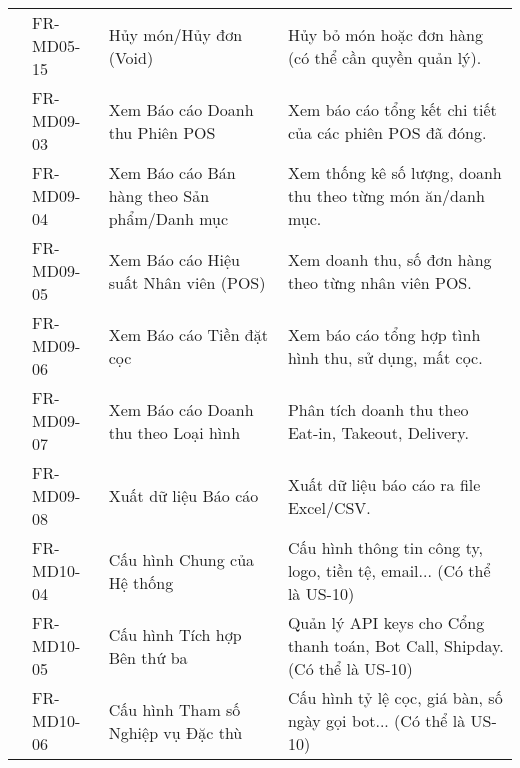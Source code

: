 \begin{longtable}{|m{2.5cm}|m{2.5cm}|m{5cm}|m{5cm}|}
	                                                        & FR-MD05-15            & Hủy món/Hủy đơn (Void)                                 & Hủy bỏ món hoặc đơn hàng (có thể cần quyền quản lý).                                        \\ \cline{2-4}
	                                                        & FR-MD09-03            & Xem Báo cáo Doanh thu Phiên POS                        & Xem báo cáo tổng kết chi tiết của các phiên POS đã đóng.                                    \\
	                                                        & FR-MD09-04            & Xem Báo cáo Bán hàng theo Sản phẩm/Danh mục            & Xem thống kê số lượng, doanh thu theo từng món ăn/danh mục.                                 \\
	                                                        & FR-MD09-05            & Xem Báo cáo Hiệu suất Nhân viên (POS)                  & Xem doanh thu, số đơn hàng theo từng nhân viên POS.                                         \\
	                                                        & FR-MD09-06            & Xem Báo cáo Tiền đặt cọc                               & Xem báo cáo tổng hợp tình hình thu, sử dụng, mất cọc.                                       \\
	                                                        & FR-MD09-07            & Xem Báo cáo Doanh thu theo Loại hình                   & Phân tích doanh thu theo Eat-in, Takeout, Delivery.                                         \\
	                                                        & FR-MD09-08            & Xuất dữ liệu Báo cáo                                   & Xuất dữ liệu báo cáo ra file Excel/CSV.                                                     \\ \cline{2-4}
	                                                        & FR-MD10-04            & Cấu hình Chung của Hệ thống                            & Cấu hình thông tin công ty, logo, tiền tệ, email... (Có thể là US-10)                       \\
	                                                        & FR-MD10-05            & Cấu hình Tích hợp Bên thứ ba                           & Quản lý API keys cho Cổng thanh toán, Bot Call, Shipday. (Có thể là US-10)                  \\
	                                                        & FR-MD10-06            & Cấu hình Tham số Nghiệp vụ Đặc thù                     & Cấu hình tỷ lệ cọc, giá bàn, số ngày gọi bot... (Có thể là US-10)                           \\
	\hline


\end{longtable}
